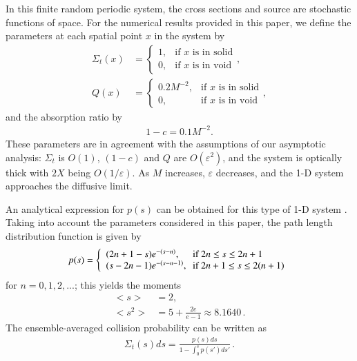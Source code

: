 \documentclass{anstrans}
\newcommand{\bl}{\big<}
\newcommand{\bg}{\big>}
\begin{document}
In this finite random periodic system, the cross sections and source are stochastic functions of space. For the numerical results provided in this paper, we define the parameters at each spatial point $x$ in the system by
\begin{align}
\Sigma_t(x) &= \left\{\begin{array}{cc} 1, & \text{if $x$ is in solid} \\ 0, & \text{if $x$ is in void} \end{array}\right. ,\nonumber\\
Q(x) &= \left\{\begin{array}{cc} 0.2M^{-2}, & \text{if $x$ is in solid} \\ 0, & \text{if $x$ is in void} \end{array}\right. \nonumber,
\end{align}
and the absorption ratio by
\begin{align}
1-c = 0.1M^{-2}.\nonumber
\end{align}
These parameters are in agreement with the assumptions of our asymptotic analysis: $\Sigma_{t}$ is $O(1)$, $(1-c)$ and $Q$ are $O(\varepsilon^2)$, and the system is optically thick with $2X$ being $O(1/\varepsilon)$.
As $M$ increases, $\varepsilon$ decreases, and the 1-D system approaches the diffusive limit.

An analytical expression for $p(s)$ can be obtained for this type of 1-D system \cite{vas15}. Taking into account the parameters considered in this paper, the path length distribution function is given by 
\begin{align}
p(s) = \left\{
\begin{array}{ll}
(2n+1-s)e^{-(s-n)}, & \text{\hspace{-3pt}if $2n\leq s \leq 2n+1$}\\
(s-2n-1)e^{-(s-n-1)}, & \text{\hspace{-3pt}if $2n+1\leq s \leq 2(n+1)$}
\end{array}
\right.\nonumber
\end{align}
for $n=0,1,2,...$; this yields the moments
\begin{align}
\bl s\bg &= 2,\nonumber\\
\bl s^2\bg &= 5+\frac{2e}{e-1} \approx 8.1640 \, .\nonumber
\end{align}
The ensemble-averaged collision probability can be written as \cite{vas14a}
\begin{align}
\Sigma_t(s)ds = \frac{p(s)ds}{1-\int_0^sp(s')ds'}\,.\nonumber
\end{align} 
\end{document}
